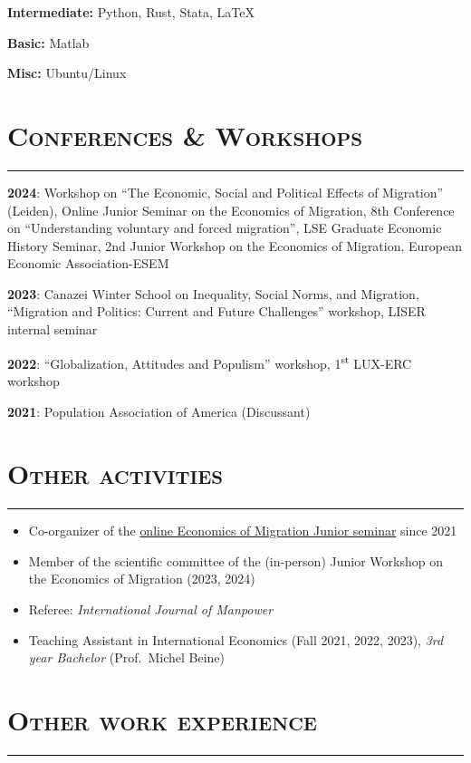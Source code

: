 \documentclass{article}
\newcommand{\sectionline}{%
  \vspace{-0.6cm}%
  \par\noindent\rule{\textwidth}{0.4pt}%
  \vspace{0.3cm}%
}
\let\xsection=\section
\renewcommand{\section}[1]{%
  \vspace{0.1cm}%
  \xsection*{\scshape{#1}}%
  \sectionline%
}
\begin{document}
\textbf{Intermediate:} Python, Rust, Stata, LaTeX

\textbf{Basic:} Matlab

\textbf{Misc:} Ubuntu/Linux

\hypertarget{conferences-workshops}{%
\section{Conferences \& Workshops}\label{conferences-workshops}}

\textbf{2024}: Workshop on ``The Economic, Social and Political Effects of Migration'' (Leiden), Online Junior Seminar on the Economics of Migration, 8th Conference on ``Understanding voluntary and forced migration'', LSE Graduate Economic History Seminar, 2nd Junior Workshop on the Economics of Migration, European Economic Association-ESEM 

\textbf{2023}: Canazei Winter School on Inequality, Social Norms, and
Migration, ``Migration and Politics: Current and Future Challenges''
workshop, LISER internal seminar

\textbf{2022}: ``Globalization, Attitudes and Populism'' workshop,
1\textsuperscript{st} LUX-ERC workshop

\textbf{2021}: Population Association of America (Discussant)

\hypertarget{relevant-activities}{%
\section{Other activities}\label{relevant-activities}}

\begin{itemize}

\item
  Co-organizer of the
  \href{https://sites.google.com/view/the-economics-of-migration}{online
  Economics of Migration Junior seminar} since 2021
\item
  Member of the scientific committee of the (in-person) Junior Workshop
  on the Economics of Migration (2023, 2024)
\item Referee: \emph{International Journal of Manpower}
\item
  Teaching Assistant in International Economics (Fall 2021, 2022, 2023), \emph{3rd year
  Bachelor} (Prof.~Michel Beine)
\end{itemize}

\hypertarget{relevant-work-experience}{%
\section{Other work experience}\label{relevant-work-experience}}
\end{document}
